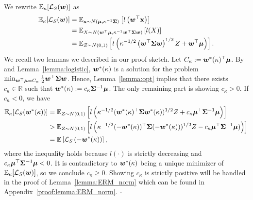 We rewrite $\mathbb{E}_\kappa[\mathcal{L}_S ({\bm{w}}) ] $ as
\begin{align}\label{eqn:ERM_rewrite}
    \mathbb{E}_\kappa[\mathcal{L}_S ({\bm{w}}) ] &= \mathbb{E}_{{\mathbf{x}} \sim N({\bm{\mu}}, \kappa^{-1} {\bm{\Sigma}})}\left[l\left( {\bm{w}}^\top {\mathbf{x}} \right)\right]\nonumber \\
    &= \mathbb{E}_{X \sim N({\bm{w}}^\top {\bm{\mu}}, \kappa^{-1} {\bm{w}}^\top {\bm{\Sigma}} {\bm{w}} )}\left[l(X)\right] \nonumber\\
    &= \mathbb{E}_{Z\sim N(0, 1 )}\left[l\left( \kappa^{-1/2} \left({\bm{w}} ^\top {\bm{\Sigma}} {\bm{w}} \right)^{1/2} Z + {\bm{w}}^\top {\bm{\mu}} \right)\right].
\end{align}
We recall two lemmas we described in our proof sketch.
\logistic*
\opt*
Let $C_\kappa := {\bm{w}}^*(\kappa)^\top {\bm{\mu}}$. By  and Lemma~\ref{lemma:logistic}, ${\bm{w}}^*(\kappa)$ is a solution for the problem $\min_{{\bm{w}}^\top {\bm{\mu}} = C_\kappa}\frac{1}{2} {\bm{w}}^\top {\bm{\Sigma}} {\bm{w}}$.
 Hence, Lemma~\ref{lemma:opt} implies that there exists $c_\kappa \in \mathbb{R}$ such that ${\bm{w}}^*(\kappa):= c_\kappa {\bm{\Sigma}}^{-1}{\bm{\mu}}$. The only remaining part is showing $c_\kappa>0$. If $c_\kappa <0$, we have 
\begin{align*}
    \mathbb{E}_\kappa[\mathcal{L}_S({\bm{w}}^*(\kappa))] &= \mathbb{E}_{Z \sim N(0,1)} \left [l\left (\kappa^{-1/2}({\bm{w}}^*(\kappa)^\top {\bm{\Sigma}} {\bm{w}}^*(\kappa))^{1/2} Z + c_\kappa {\bm{\mu}}^\top {\bm{\Sigma}}^{-1} {\bm{\mu}} \right ) \right ]\\
    &> \mathbb{E}_{Z \sim N(0,1)} \left [l \left (\kappa^{-1/2}(-{\bm{w}}^*(\kappa))^\top  {\bm{\Sigma}} (-{\bm{w}}^*(\kappa)))^{1/2} Z - c_\kappa {\bm{\mu}}^\top {\bm{\Sigma}}^{-1} {\bm{\mu}}) \right ) \right ]\\
    &= \mathbb{E}\left [\mathcal{L}_S \left ( -{\bm{w}}^*(\kappa)  \right ) \right ],
\end{align*}
where the inequality holds because $l(\cdot)$ is strictly decreasing and $c_\kappa {\bm{\mu}}^\top {\bm{\Sigma}}^{-1} {\bm{\mu}} < 0$.
It is contradictory to ${\bm{w}}^*(\kappa)$ being a unique minimizer of $\mathbb{E}_\kappa[\mathcal{L}_S({\bm{w}})]$, so we conclude $c_\kappa \geq 0$.  Showing $c_\kappa$ is strictly positive will be handled in the proof of Lemma~\ref{lemma:ERM_norm} which can be found in Appendix~\ref{proof:lemma:ERM_norm}. \hfill $\square$

